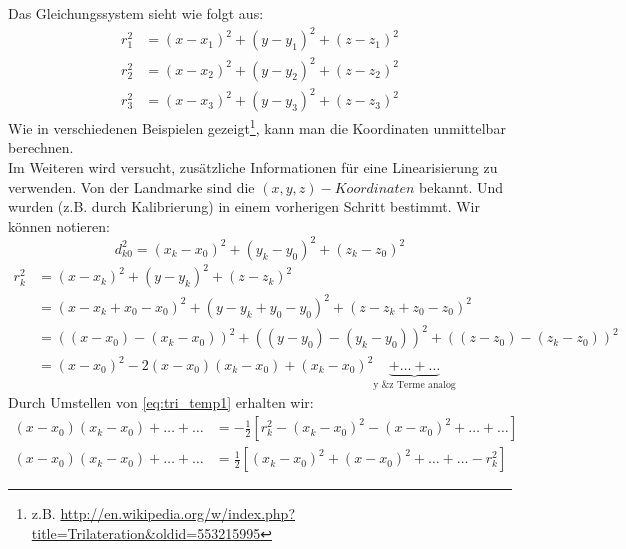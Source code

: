 Das Gleichungssystem sieht wie folgt aus:
\begin{align}
	r_{1}^2 &= (x-x_1)^2+(y-y_1)^2+(z-z_1)^2 \nonumber\\
	r_{2}^2 &= (x-x_2)^2+(y-y_2)^2+(z-z_2)^2 \nonumber\\
	r_{3}^2 &= (x-x_3)^2+(y-y_3)^2+(z-z_3)^2 \nonumber
%	
\end{align}
%
Wie in verschiedenen Beispielen gezeigt\footnote{z.B. \url{http://en.wikipedia.org/w/index.php?title=Trilateration&oldid=553215995}}, kann man die Koordinaten unmittelbar berechnen.\\
Im Weiteren wird versucht, zusätzliche Informationen für eine Linearisierung zu verwenden. Von der Landmarke sind die $(x,y,z)-Koordinaten$ bekannt. Und wurden (z.B. durch Kalibrierung) in einem vorherigen Schritt bestimmt.
Wir können notieren:
%
\begin{equation}\label{eq:d_k0}
d_{k0}^2= (x_k-x_0)^2+(y_k-y_0)^2+(z_k-z_0)^2
\end{equation}
%
\begin{align}
	r_{k}^2 &= (x-x_k)^2+(y-y_k)^2+(z-z_k)^2 \nonumber \\
	&=(x-x_k+x_0-x_0)^2+(y-y_k+y_0-y_0)^2+(z-z_k+z_0-z_0)^2 \nonumber \\
	&=((x-x_0)-(x_k-x_0))^2+((y-y_0)-(y_k-y_0))^2+((z-z_0)-(z_k-z_0))^2 \nonumber \\ 
	&=(x-x_0)^2-2(x-x_0)(x_k-x_0)+(x_k-x_0)^2\underbrace{+\dots{}+\dots{}}_\text{y \& z Terme analog}\label{eq:tri_temp1}
%
\end{align}
%
Durch Umstellen von \eqref{eq:tri_temp1} erhalten wir:
\begin{align}
(x-x_0)(x_k-x_0)+\dots{}+\dots{}&= -\frac{1}{2}[r_k^2-(x_k-x_0)^2 -(x-x_0)^2 +\dots{} +\dots{}]\nonumber\\
(x-x_0)(x_k-x_0)+\dots{}+\dots{}&= \frac{1}{2}[(x_k-x_0)^2 +(x-x_0)^2 +\dots{}+\dots{}-r_k^2]\nonumber
%
\end{align}

